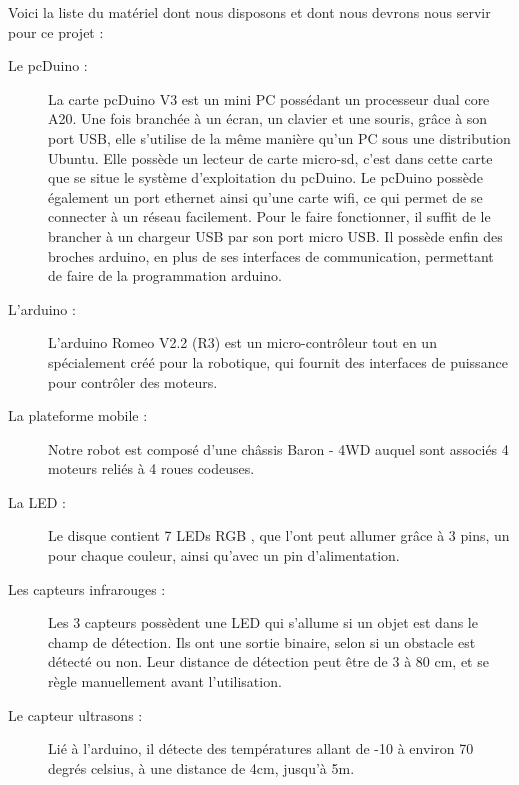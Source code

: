 \documentclass[12pt,francais]{report}
\begin{document}
Voici la liste du matériel dont nous disposons et dont nous devrons nous servir pour ce projet :

\begin{description}
\item [Le pcDuino :] La carte pcDuino V3 est un mini PC possédant un processeur dual core A20. Une fois branchée à un écran, un clavier et une souris, grâce à son port USB, elle s'utilise de la même manière qu'un PC sous une distribution Ubuntu. Elle possède un lecteur de carte micro-sd,  c'est dans cette carte que se situe le système d'exploitation du pcDuino. Le pcDuino possède également un port ethernet ainsi qu'une carte wifi, ce qui permet de se connecter à un réseau facilement. Pour le faire fonctionner, il suffit de le brancher à un chargeur USB par son port micro USB. Il possède enfin des broches arduino, en plus de ses interfaces de communication, permettant de faire de la programmation arduino.\cite{ref3}
\item [L'arduino :] L'arduino Romeo V2.2 (R3) \cite{ref4} est un micro-contrôleur tout en un spécialement créé pour la robotique, qui fournit des interfaces de puissance pour contrôler des moteurs.
\item [La plateforme mobile :] Notre robot est composé d'une châssis Baron - 4WD auquel sont associés 4 moteurs reliés à 4 roues codeuses. \cite{ref5}
\item [La LED :] Le disque contient 7 LEDs RGB \cite{ref6}, que l'ont peut allumer grâce à 3 pins, un pour chaque couleur, ainsi qu'avec un pin d'alimentation.
\item [Les capteurs infrarouges :] Les 3 capteurs possèdent une LED qui s'allume si un objet est dans le champ de détection. Ils ont une sortie binaire, selon si un obstacle est détecté ou non. Leur distance de détection peut être de 3 à 80 cm, et se règle manuellement avant l'utilisation. \cite{ref7}
\item [Le capteur ultrasons :] Lié à l'arduino, il détecte des températures allant de -10 à environ 70 degrés celsius, à une distance de 4cm, jusqu'à 5m. \cite{ref8}
\end{description}
\end{document}
